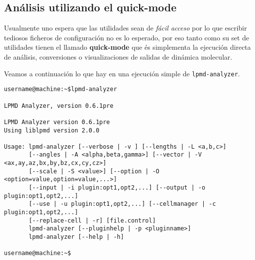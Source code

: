 
\subsection{An\'alisis utilizando el quick-mode}

Usualmente uno espera que las utilidades sean de \textit{f\'acil acceso} por lo que escribir tediosos ficheros de configuraci\'on no es lo esperado, por eso tanto {\lpmd} como su set de utilidades tienen el llamado \textbf{quick-mode} que \'es simplementa la ejecuci\'on directa de an\'alisis, conversiones o visualizaciones de salidas de din\'amica molecular.

Veamos a continuaci\'on lo que hay en una ejecuci\'on simple de \verb|lpmd-analyzer|.

\begin{verbatim}
username@machine:~$lpmd-analyzer

LPMD Analyzer, version 0.6.1pre

LPMD Analyzer version 0.6.1pre
Using liblpmd version 2.0.0

Usage: lpmd-analyzer [--verbose | -v ] [--lengths | -L <a,b,c>]
       [--angles | -A <alpha,beta,gamma>] [--vector | -V <ax,ay,az,bx,by,bz,cx,cy,cz>] 
       [--scale | -S <value>] [--option | -O <option=value,option=value,...>] 
       [--input | -i plugin:opt1,opt2,...] [--output | -o plugin:opt1,opt2,...] 
       [--use | -u plugin:opt1,opt2,...] [--cellmanager | -c plugin:opt1,opt2,...] 
       [--replace-cell | -r] [file.control]
       lpmd-analyzer [--pluginhelp | -p <pluginname>]
       lpmd-analyzer [--help | -h]

username@machine:~$ 
\end{verbatim}

